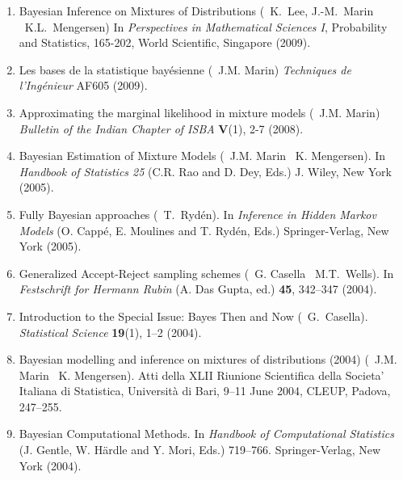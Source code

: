 \begin{enumerate}
\item Bayesian Inference on Mixtures of Distributions
(\avec\ K.~Lee, J.-M.~Marin \et\ K.L.~Mengersen)
In {\em Perspectives in Mathematical Sciences I}, Probability and Statistics, 
165-202, World Scientific, Singapore (2009).

\item Les bases de la statistique bay\'esienne 
(\avec\ J.M. Marin) {\em Techniques de l'Ing\'enieur} AF605 (2009). 

\item Approximating the marginal likelihood in mixture models
(\avec\ J.M. Marin) {\em Bulletin of the Indian Chapter of ISBA}
{\bf V}(1), 2-7 (2008).


\item Bayesian Estimation of Mixture Models (\avec\ J.M. Marin \et\
K. Mengersen). In {\em Handbook of Statistics 25} (C.R. Rao and D. Dey,
Eds.) J. Wiley, New York (2005).

\item Fully Bayesian approaches (\avec\ T.\ Ryd\'en). In {\it Inference in Hidden 
Markov Models} (O. Capp\'e, E. Moulines and T. Ryd\'en, Eds.) Springer-Verlag, New York (2005). 

\item Generalized Accept-Reject sampling schemes (\avec\ G. Casella \et\ M.T.~Wells).
In {\em Festschrift for Hermann Rubin} (A. Das Gupta, ed.) {\bf 45}, 342--347 (2004).

\item Introduction to the Special Issue: Bayes Then and Now (\avec\ G.~Casella).
{\em Statistical Science} {\bf 19}(1), 1--2 (2004).

\item Bayesian modelling and inference on mixtures of distributions (2004) (\avec\  J.M. Marin \et\
K. Mengersen). Atti della XLII Riunione Scientifica della Societa' Italiana di Statistica,
Universit\`a di Bari, 9--11 June 2004, CLEUP, Padova, 247--255.

\item Bayesian Computational Methods. In {\em Handbook of Computational
Statistics} (J. Gentle, W. H\"ardle and Y. Mori, Eds.) 719--766. Springer-Verlag, 
New York (2004).


\end{enumerate}

